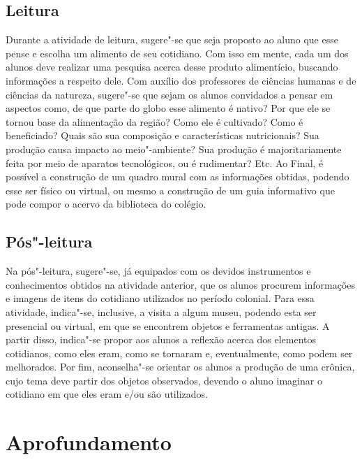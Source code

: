\documentclass[12pt]{extarticle}
\begin{document}
\subsection{Leitura}

Durante a atividade de leitura, sugere"-se que seja proposto ao aluno que
esse pense e escolha um alimento de seu cotidiano. Com isso em mente,
cada um dos alunos deve realizar uma pesquisa acerca desse produto
alimentício, buscando informações a respeito dele. Com auxílio dos
professores de ciências humanas e de ciências da natureza, sugere"-se que
sejam os alunos convidados a pensar em aspectos como, de que parte do
globo esse alimento é nativo? Por que ele se tornou base da alimentação
da região? Como ele é cultivado? Como é beneficiado? Quais são sua
composição e características nutricionais? Sua produção causa impacto ao
meio"-ambiente? Sua produção é majoritariamente feita por meio de
aparatos tecnológicos, ou é rudimentar? Etc. Ao Final, é possível a
construção de um quadro mural com as informações obtidas, podendo esse
ser físico ou virtual, ou mesmo a construção de um guia informativo que
pode compor o acervo da biblioteca do colégio.


\subsection{Pós"-leitura}

Na pós"-leitura, sugere"-se, já equipados com os devidos
instrumentos e conhecimentos obtidos na atividade anterior, que os
alunos procurem informações e imagens de itens do cotidiano utilizados
no período colonial. Para essa atividade, indica"-se, inclusive, a visita
a algum museu, podendo esta ser presencial ou virtual, em que se
encontrem objetos e ferramentas antigas. A partir disso, indica"-se
propor aos alunos a reflexão acerca dos elementos cotidianos, como eles
eram, como se tornaram e, eventualmente, como podem ser melhorados. Por
fim, aconselha"-se orientar os alunos a produção de uma crônica, cujo
tema deve partir dos objetos observados, devendo o aluno imaginar o
cotidiano em que eles eram e/ou são utilizados.

\section{Aprofundamento}
\end{document}
